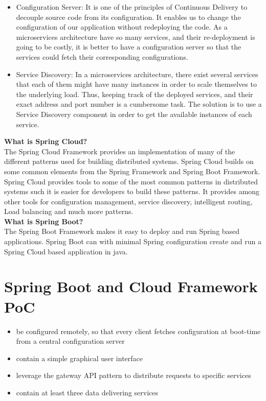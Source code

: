 \begin{itemize}
	\item Configuration Server: It is one of the principles of Continuous Delivery to decouple source code from its configuration. It enables us to change the configuration of our application without redeploying the code. As a microservices architecture have so many services, and their re-deployment is going to be costly, it is better to have a configuration server so that the services could fetch their corresponding configurations.
	\item Service Discovery: 
	In a microservices architecture, there exist several services that each of them might have many instances in order to scale themselves to the underlying load. Thus, keeping track of the deployed services, and their exact address and port number is a cumbersome task. The solution is to use a Service Discovery component in order to get the available instances of each service.		
\end{itemize}

\textbf{What is Spring Cloud?}\\
The Spring Cloud Framework provides an implementation of many of the different patterns used for building distributed systems. Spring Cloud builds on some common elements from the Spring Framework and Spring Boot Framework. Spring Cloud provides tools to some of the most common patterns in distributed systems such it is easier for developers to build these patterns. It provides among other tools for configuration management, service discovery, intelligent routing, Load balancing and much more patterns.\\

\textbf{What is Spring Boot?}\\
The Spring Boot Framework makes it easy to deploy and run Spring based applications. Spring Boot can with minimal Spring configuration create and run a \eg Spring Cloud based application in java.  \\


\section{Spring Boot and Cloud Framework PoC}
\begin{itemize}
	\item be configured remotely, so that every client fetches configuration at boot-time from a central configuration server
	\item contain a simple graphical user interface
	\item leverage the gateway API pattern to distribute requests to specific services
	\item contain at least three data delivering services 
\end{itemize}

